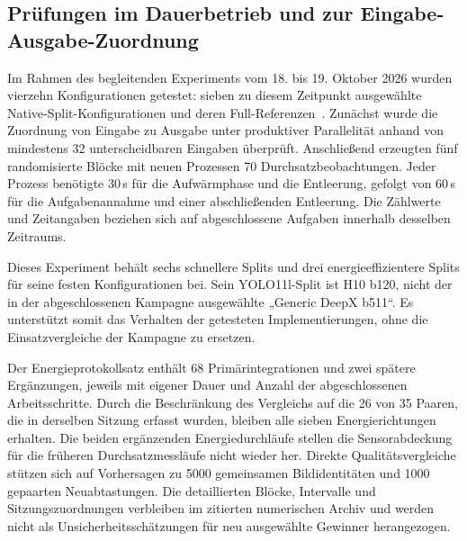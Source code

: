 \subsection{Prüfungen im Dauerbetrieb und zur Eingabe-Ausgabe-Zuordnung}
\label{sec:review:confirmation_statistics}

Im Rahmen des begleitenden Experiments vom 18. bis 19. Oktober 2026 wurden vierzehn Konfigurationen getestet: sieben zu diesem Zeitpunkt ausgewählte Native-Split-Konfigurationen und deren Full-Referenzen~\cite{v49Confirmation2026}. Zunächst wurde die Zuordnung von Eingabe zu Ausgabe unter produktiver Parallelität anhand von mindestens 32 unterscheidbaren Eingaben überprüft. Anschließend erzeugten fünf randomisierte Blöcke mit neuen Prozessen 70 Durchsatzbeobachtungen. Jeder Prozess benötigte 30\,s für die Aufwärmphase und die Entleerung, gefolgt von 60\,s für die Aufgabenannahme und einer abschließenden Entleerung. Die Zählwerte und Zeitangaben beziehen sich auf abgeschlossene Aufgaben innerhalb desselben Zeitraums.

Dieses Experiment behält sechs schnellere Splits und drei energieeffizientere Splits für seine festen Konfigurationen bei. Sein YOLO11l-Split ist H10 b120, nicht der in der abgeschlossenen Kampagne ausgewählte „Generic DeepX b511“. Es unterstützt somit das Verhalten der getesteten Implementierungen, ohne die Einsatzvergleiche der Kampagne zu ersetzen.

Der Energieprotokollsatz enthält 68 Primärintegrationen und zwei spätere Ergänzungen, jeweils mit eigener Dauer und Anzahl der abgeschlossenen Arbeitsschritte. Durch die Beschränkung des Vergleichs auf die 26 von 35 Paaren, die in derselben Sitzung erfasst wurden, bleiben alle sieben Energierichtungen erhalten. Die beiden ergänzenden Energiedurchläufe stellen die Sensorabdeckung für die früheren Durchsatzmessläufe nicht wieder her. Direkte Qualitätsvergleiche stützen sich auf Vorhersagen zu \num{5000} gemeinsamen Bildidentitäten und \num{1000} gepaarten Neuabtastungen. Die detaillierten Blöcke, Intervalle und Sitzungszuordnungen verbleiben im zitierten numerischen Archiv und werden nicht als Unsicherheitsschätzungen für neu ausgewählte Gewinner herangezogen.